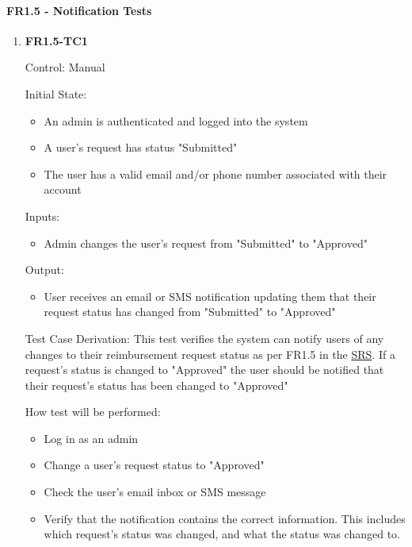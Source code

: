 \documentclass[12pt, titlepage]{article}
\begin{document}
\paragraph{FR1.5 - Notification Tests}

\begin{enumerate}
    \item{\textbf{FR1.5-TC1}}
    \hypertarget{FR1.5-TC1}{}
    
    Control: Manual
    
    Initial State:
    \begin{itemize}
        \item An admin is authenticated and logged into the system
        \item A user's request has status "Submitted"
        \item The user has a valid email and/or phone number associated with their account
    \end{itemize}
    
    Inputs: 
    \begin{itemize}
        \item Admin changes the user's request from "Submitted" to "Approved"
    \end{itemize}
    
    Output: 
    \begin{itemize}
        \item User receives an email or SMS notification updating them that their request status has changed from "Submitted" to "Approved"
    \end{itemize}
    
    Test Case Derivation: This test verifies the system can notify users of any changes to their reimbursement request status as per FR1.5 in the \href{https://shorturl.at/FdAgR}{SRS}. If a request's status is changed to "Approved" the user should be notified that their request's status has been changed to "Approved"
    
    How test will be performed:
    \begin{itemize}
        \item Log in as an admin
        \item Change a user's request status to "Approved"
        \item Check the user's email inbox or SMS message
        \item Verify that the notification contains the correct information. This includes which request's status was changed, and what the status was changed to.
    \end{itemize}
\end{enumerate}
\end{document}
